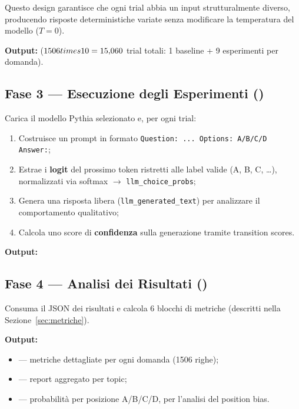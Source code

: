 \documentclass[../relazione.tex]{subfiles}
\begin{document}
\noindent Questo design garantisce che ogni trial abbia un input strutturalmente diverso, producendo risposte deterministiche variate senza modificare la temperatura del modello ($T=0$).

\medskip
\noindent \textbf{Output:}  ($1506 \\times 10 = 15{,}060$ trial totali: 1 baseline + 9 esperimenti per domanda).

\subsection{Fase 3 --- Esecuzione degli Esperimenti (\protect{})}

Carica il modello Pythia selezionato e, per ogni trial:
\begin{enumerate}
    \item Costruisce un prompt in formato \texttt{Question: ... Options: A/B/C/D Answer:};
    \item Estrae i \textbf{logit} del prossimo token ristretti alle label valide (A, B, C, \ldots), normalizzati via softmax $\rightarrow$ \texttt{llm\_choice\_probs};
    \item Genera una risposta libera (\texttt{llm\_generated\_text}) per analizzare il comportamento qualitativo;
    \item Calcola uno score di \textbf{confidenza} sulla generazione tramite transition scores.
\end{enumerate}

\noindent \textbf{Output:} 

\subsection{Fase 4 --- Analisi dei Risultati (\protect{})}

Consuma il JSON dei risultati e calcola 6 blocchi di metriche (descritti nella Sezione~\ref{sec:metriche}).

\noindent \textbf{Output:}
\begin{itemize}
    \item {} --- metriche dettagliate per ogni domanda (1506 righe);
    \item {} --- report aggregato per topic;
    \item {} --- probabilità per posizione A/B/C/D, per l'analisi del position bias.
\end{itemize}
\end{document}
